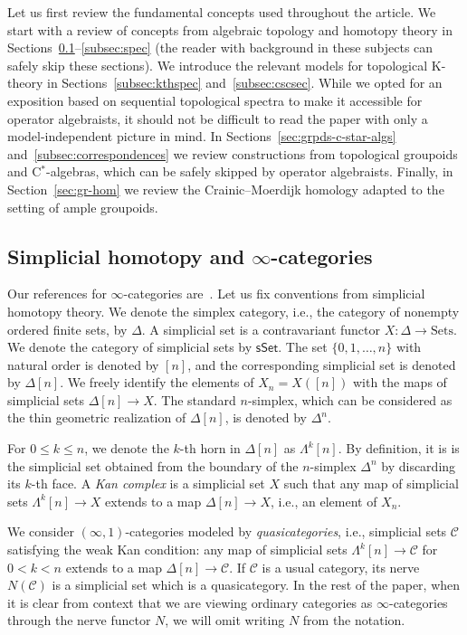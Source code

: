 \documentclass[a4paper,reqno]{amsart}
\theoremstyle{plain}
\theoremstyle{definition}
\theoremstyle{remark}
\numberwithin{equation}{section}
\newcommand{\rK}{\mathrm{K}}
\newcommand{\cC}{\mathcal{C}}
\newcommand{\sSet}{\mathsf{sSet}}
\newcommand{\Sets}{\mathrm{Sets}}
\begin{document}
Let us first review the fundamental concepts used throughout the article.
We start with a review of concepts from algebraic topology and homotopy theory in Sections~\ref{subsec:inftycat}--\ref{subsec:spec} (the reader with background in these subjects can safely skip these sections).
We introduce the relevant models for topological $\rK$-theory in Sections~\ref{subsec:kthspec} and~\ref{subsec:cscsec}.
While we opted for an exposition based on sequential topological spectra to make it accessible for operator algebraists, it should not be difficult to read the paper with only a model-independent picture in mind.
In Sections~\ref{sec:grpds-c-star-algs} and~\ref{subsec:correspondences} we review constructions from topological groupoids and C$^*$-algebras, which can be safely skipped by operator algebraists.
Finally, in Section~\ref{sec:gr-hom} we review the Crainic--Moerdijk homology adapted to the setting of ample groupoids.

\subsection{Simplicial homotopy and $\infty$-categories}\label{subsec:inftycat}

Our references for $\infty$-categories are~\cites{lur:ht,lur:ha,land:inftybook}.
Let us fix conventions from simplicial homotopy theory.
We denote the simplex category, i.e., the category of nonempty ordered finite sets, by $\Delta$.
A simplicial set is a contravariant functor $X \colon \Delta \to \Sets$.
We denote the category of simplicial sets by $\sSet$.
The set $\{0, 1, \dots, n \}$ with natural order is denoted by $[n]$, and the corresponding simplicial set is denoted by $\Delta[n]$.
We freely identify the elements of $X_n = X([n])$ with the maps of simplicial sets $\Delta[n] \to X$.
The standard $n$-simplex, which can be considered as the thin geometric realization of $\Delta[n]$, is denoted by $\Delta^n$.

For $0 \le k \le n$, we denote the $k$-th horn in $\Delta[n]$ as $\Lambda^k[n]$.
By definition, it is is the simplicial set obtained from the boundary of the $n$-simplex $\Delta^n$ by discarding its $k$-th face.
A \emph{Kan complex} is a simplicial set $X$ such that any map of simplicial sets $\Lambda^k[n] \to X$ extends to a map $\Delta[n] \to X$, i.e., an element of $X_n$.

We consider $(\infty, 1)$-categories modeled by \emph{quasicategories}, i.e., simplicial sets $\cC$ satisfying the weak Kan condition: any map of simplicial sets $\Lambda^k[n] \to \cC$ for $0 < k < n$ extends to a map $\Delta[n] \to \cC$.
If $\cC$ is a usual category, its nerve $N(\cC)$ is a simplicial set which is a quasicategory.
In the rest of the paper, when it is clear from context that we are viewing ordinary categories as $\infty$-categories through the nerve functor $N$, we will omit writing $N$ from the notation.
\end{document}
